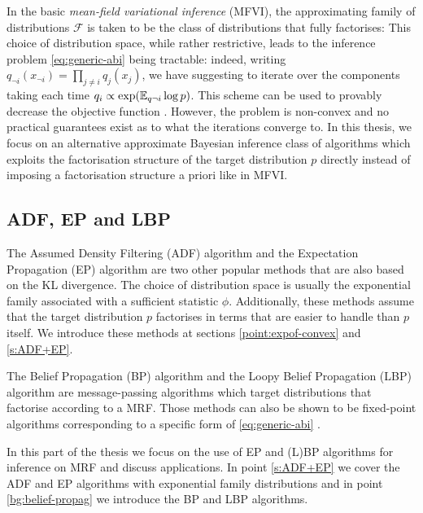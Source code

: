 In the basic \emph{mean-field variational inference} (MFVI), the approximating family of distributions $\mathcal F$ is taken to be the class of distributions that fully factorises:
%
% 
This choice of distribution space, while rather restrictive, leads to the inference problem \eqref{eq:generic-abi} being tractable: indeed, writing $q_{\neg i}(x_{\neg i}) = \prod_{j\neq i} q_{j}(x_{j}) $, we have
suggesting to iterate over the components taking each time $q_{i} \propto \exp(\mathbb E_{q\neg i} \log p) $. This scheme can be used to provably decrease the objective function \citep{hoffman13, kucukelbir16, blei16}. However, the problem is non-convex and no practical guarantees exist as to what the iterations converge to. 
In this thesis, we focus on an alternative approximate Bayesian inference class of algorithms which exploits the factorisation structure of the target distribution $p$ directly instead of imposing a factorisation structure a priori like in MFVI.

\subsection{ADF, EP and LBP}
The Assumed Density Filtering (ADF) algorithm and the  Expectation Propagation (EP) algorithm are two other popular methods that are also based on the KL divergence. The choice of distribution space is usually the exponential family associated with a sufficient statistic $\phi$. Additionally, these methods assume that the target distribution $p$ factorises in terms that are easier to handle than $p$ itself. We introduce these methods at sections \ref{point:expof-convex} and \ref{s:ADF+EP}.

The Belief Propagation (BP) algorithm and the Loopy Belief Propagation (LBP) algorithm are message-passing algorithms which target distributions that factorise according to a MRF. Those methods can also be shown to be fixed-point algorithms corresponding to a specific form of \eqref{eq:generic-abi} \citep{yedidia01, yedidia02}.

In this part of the thesis we focus on the use of EP and (L)BP algorithms for inference on MRF and discuss applications. In point \ref{s:ADF+EP} we cover the ADF and EP algorithms with exponential family distributions and in point \ref{bg:belief-propag} we introduce the BP and LBP algorithms.




